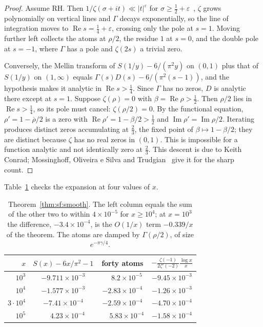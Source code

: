 \begin{proof}
Assume RH. Then $1/\zeta(\sigma+it)\ll|t|^\varepsilon$ for $\sigma\ge\frac12+\varepsilon$~\cite[Thm.~14.2]{titchmarsh1986}, $\zeta$ grows polynomially on vertical lines and $\Gamma$ decays exponentially, so the line of integration moves to $\operatorname{Re} s=\frac14+\varepsilon$, crossing only the pole at $s=1$. Moving further left collects the atoms at $\rho/2$, the residue $1$ at $s=0$, and the double pole at $s=-1$, where $\Gamma$ has a pole and $\zeta(2s)$ a trivial zero.

Conversely, the Mellin transform of $S(1/y)-6/(\pi^2y)$ on $(0,1)$ plus that of $S(1/y)$ on $(1,\infty)$ equals $\Gamma(s)D(s)-6/(\pi^2(s-1))$, and the hypothesis makes it analytic in $\operatorname{Re} s>\frac14$. Since $\Gamma$ has no zeros, $D$ is analytic there except at $s=1$. Suppose $\zeta(\rho)=0$ with $\beta=\operatorname{Re}\rho>\frac12$. Then $\rho/2$ lies in $\operatorname{Re} s>\frac14$, so its pole must cancel: $\zeta(\rho/2)=0$. By the functional equation, $\rho'=1-\overline{\rho}/2$ is a zero with $\operatorname{Re}\rho'=1-\beta/2>\frac12$ and $\operatorname{Im}\rho'=\operatorname{Im}\rho/2$. Iterating produces distinct zeros accumulating at $\frac23$, the fixed point of $\beta\mapsto1-\beta/2$; they are distinct because $\zeta$ has no real zeros in $(0,1)$. This is impossible for a function analytic and not identically zero at $\frac23$. This descent is due to Keith Conrad; Mossinghoff, Oliveira e Silva and Trudgian~\cite{mot2021} give it for the sharp count.
\end{proof}

Table~\ref{tab:sf:smooth} checks the expansion at four values of $x$.

\begin{table}[t]
\centering
\begin{tabular}{rccc}
\toprule
$x$ & $S(x)-6x/\pi^2-1$ & forty atoms & $-\frac{\zeta(-1)}{2\zeta'(-2)}\frac{\log x}{x}$\\
\midrule
$10^3$ & $-9.711\times10^{-3}$ & $\phantom{-}8.2\times10^{-5}$ & $-9.45\times10^{-3}$\\
$10^4$ & $-1.577\times10^{-3}$ & $-2.83\times10^{-4}$ & $-1.26\times10^{-3}$\\
$3\cdot10^4$ & $-7.41\times10^{-4}$ & $-2.59\times10^{-4}$ & $-4.70\times10^{-4}$\\
$10^5$ & $\phantom{-}4.23\times10^{-4}$ & $\phantom{-}5.83\times10^{-4}$ & $-1.58\times10^{-4}$\\
\bottomrule
\end{tabular}
\caption{Theorem~\ref{thm:sf:smooth}. The left column equals the sum of the other two to within $4\times10^{-5}$ for $x\ge10^4$; at $x=10^3$ the difference, $-3.4\times10^{-4}$, is the $O(1/x)$ term $-0.339/x$ of the theorem. The atoms are damped by $\Gamma(\rho/2)$, of size $e^{-\pi\gamma/4}$.}
\label{tab:sf:smooth}
\end{table}

